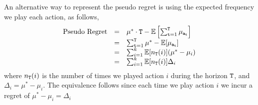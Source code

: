 An alternative way to represent the pseudo regret is using the expected frequency we play each action, as follows,
\[
\begin{array}{ccl}
\text{Pseudo Regret} & = & \mu^{*}\cdot {\tt T}- \mathbb{E}\left[\sum_{{\tt t}=1}^{{\tt T}}\mu_{{\tt a}_{{\tt t}}}\right]\\
 & = & \sum_{{\tt t}=1}^{{\tt T}} \mu^* - \mathbb{E}[\mu_{{\tt a}_{{\tt t}}}] \\
 & = & \sum_{i=1}^k \mathbb{E}[n_{\tt T}(i)] (\mu^*-\mu_i)\\
  & = & \sum_{i=1}^k \mathbb{E}[n_{\tt T}(i)] \Delta_i
\end{array}
\]
where $n_{\tt T}(i)$ is the number of times we played action $i$ during the horizon ${\tt T}$, and $\Delta_i=\mu^*-\mu_i$.
The equivalence follows since each time we play action $i$ we incur a regret of $\mu^*-\mu_i= \Delta_i$






